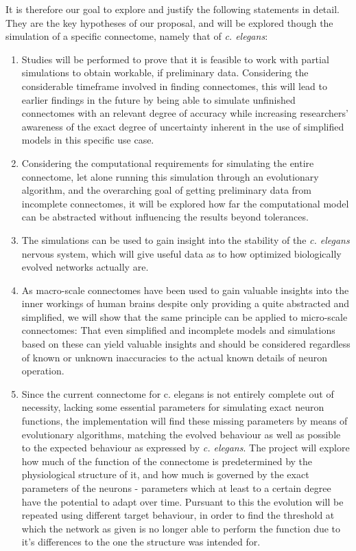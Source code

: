 \documentclass[a4paper,11pt]{article}
\begin{document}
It is therefore our goal to explore and justify the following statements in detail. They are the key hypotheses of our proposal, and will be explored though the simulation of a specific connectome, namely that of \emph{c. elegans}:
\begin{enumerate}
\item Studies will be performed to prove that it is feasible to work with partial simulations to obtain workable, if preliminary data. Considering the considerable timeframe involved in finding connectomes, this will lead to earlier findings in the future by being able to simulate unfinished connectomes with an relevant degree of accuracy while increasing researchers' awareness of the exact degree of uncertainty inherent in the use of simplified models in this specific use case.
\item Considering the computational requirements for simulating the entire connectome, let alone running this simulation through an evolutionary algorithm, and the overarching goal of getting preliminary data from incomplete connectomes, it will be explored how far the computational model can be abstracted without influencing the results beyond tolerances.
\item The simulations can be used to gain insight into the stability of the \emph{c. elegans} nervous system, which will give useful data as to how optimized biologically evolved networks actually are. 
\item As macro-scale connectomes have been used to gain valuable insights into the inner workings of human brains despite only providing a quite abstracted and simplified, we will show that the same principle can be applied to micro-scale connectomes: That even simplified and incomplete models and simulations based on these can yield valuable insights and should be considered regardless of known or unknown inaccuracies to the actual known details of neuron operation. 
\item Since the current connectome for c. elegans is not entirely complete out of necessity, lacking some essential parameters for simulating exact neuron functions, the implementation will find these missing parameters by means of evolutionary algorithms, matching the evolved behaviour as well as possible to the expected behaviour as expressed by \emph{c. elegans}. The project will explore how much of the function of the connectome is predetermined by the physiological structure of it, and how much is governed by the exact parameters of the neurons - parameters which at least to a certain degree have the potential to adapt over time. Pursuant to this the evolution will be repeated using different target behaviour, in order to find the threshold at which the network as given is no longer able to perform the function due to it's differences to the one the structure was intended for. 
\end{enumerate}
\end{document}
